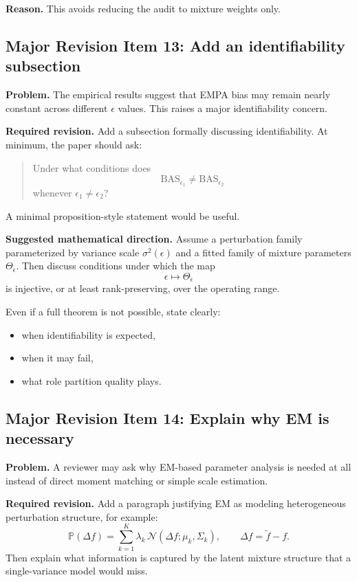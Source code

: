 \textbf{Reason.} This avoids reducing the audit to mixture weights only.

\subsection*{Major Revision Item 13: Add an identifiability subsection}
\textbf{Problem.} The empirical results suggest that EMPA bias may remain nearly constant across different $\epsilon$ values. This raises a major identifiability concern.

\textbf{Required revision.}
Add a subsection formally discussing identifiability. At minimum, the paper should ask:

\begin{quote}
Under what conditions does
\[
\mathrm{BAS}_{\epsilon_1} \neq \mathrm{BAS}_{\epsilon_2}
\]
whenever $\epsilon_1 \neq \epsilon_2$?
\end{quote}

A minimal proposition-style statement would be useful.

\textbf{Suggested mathematical direction.}
Assume a perturbation family parameterized by variance scale $\sigma^2(\epsilon)$ and a fitted family of mixture parameters $\Theta_\epsilon$. Then discuss conditions under which the map
\[
\epsilon \mapsto \Theta_\epsilon
\]
is injective, or at least rank-preserving, over the operating range.

Even if a full theorem is not possible, state clearly:
\begin{itemize}
    \item when identifiability is expected,
    \item when it may fail,
    \item what role partition quality plays.
\end{itemize}

\subsection*{Major Revision Item 14: Explain why EM is necessary}
\textbf{Problem.} A reviewer may ask why EM-based parameter analysis is needed at all instead of direct moment matching or simple scale estimation.

\textbf{Required revision.}
Add a paragraph justifying EM as modeling heterogeneous perturbation structure, for example:
\[
\mathbb{P}(\Delta f)
=
\sum_{k=1}^{K}
\lambda_k \,
\mathcal{N}(\Delta f; \mu_k, \Sigma_k),
\qquad
\Delta f = \tilde{f} - f.
\]
Then explain what information is captured by the latent mixture structure that a single-variance model would miss.

